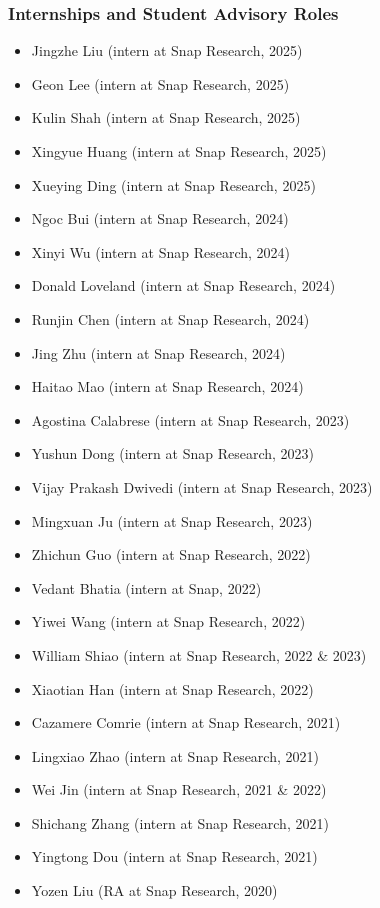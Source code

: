 \documentclass{article}
\begin{document}
\subsubsection*{\bf {Internships and Student Advisory Roles}}

\begin{itemize}
\item Jingzhe Liu (intern at Snap Research, 2025)
\item Geon Lee (intern at Snap Research, 2025)
\item Kulin Shah (intern at Snap Research, 2025)
\item Xingyue Huang (intern at Snap Research, 2025)
\item Xueying Ding (intern at Snap Research, 2025)
\item Ngoc Bui (intern at Snap Research, 2024)
\item Xinyi Wu (intern at Snap Research, 2024)
\item Donald Loveland (intern at Snap Research, 2024)
\item Runjin Chen (intern at Snap Research, 2024)
\item Jing Zhu (intern at Snap Research, 2024)
\item Haitao Mao (intern at Snap Research, 2024)
\item Agostina Calabrese (intern at Snap Research, 2023)
\item Yushun Dong (intern at Snap Research, 2023)
\item Vijay Prakash Dwivedi (intern at Snap Research, 2023)
\item Mingxuan Ju (intern at Snap Research, 2023)
\item Zhichun Guo (intern at Snap Research, 2022)
\item Vedant Bhatia (intern at Snap, 2022)
\item Yiwei Wang (intern at Snap Research, 2022)
\item William Shiao (intern at Snap Research, 2022 \& 2023)
\item Xiaotian Han (intern at Snap Research, 2022)
\item Cazamere Comrie (intern at Snap Research, 2021)
\item Lingxiao Zhao (intern at Snap Research, 2021)
\item Wei Jin (intern at Snap Research, 2021 \& 2022)
\item Shichang Zhang (intern at Snap Research, 2021)
\item Yingtong Dou (intern at Snap Research, 2021)
\item Yozen Liu (RA at Snap Research, 2020)

\end{itemize}
\end{document}

